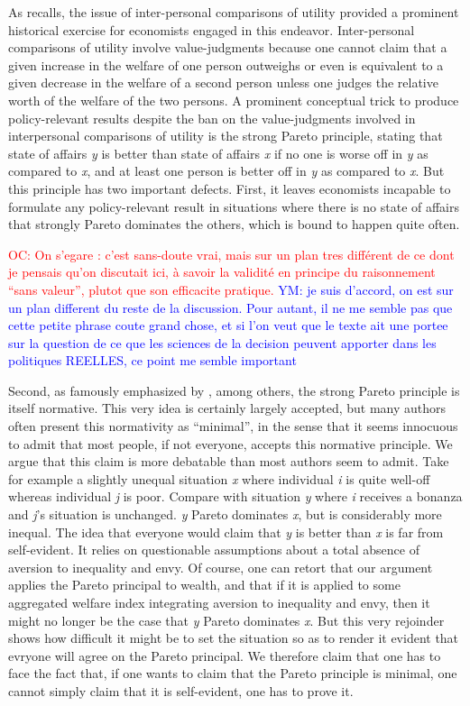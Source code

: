 \documentclass[preprint,11pt]{elsarticle}
\newcommand{\commentYM}[1]{\textcolor{blue}{YM: #1}}
\newcommand{\commentOC}[1]{\textcolor{red}{OC: #1}}
\begin{document}
As \cite{baujard_leconomie_2011} recalls, the issue of inter-personal comparisons of utility provided a prominent historical exercise for economists engaged in this endeavor. Inter-personal comparisons of utility involve value-judgments because one cannot claim that a given increase in the welfare of one person outweighs or even is equivalent to a given decrease in the welfare of a second person unless one judges the relative worth of the welfare of the two persons. A prominent conceptual trick to produce policy-relevant results despite the ban on the value-judgments involved in interpersonal comparisons of utility is the strong Pareto principle, stating that state of affairs \emph{y} is better than state of affairs \emph{x} if no one is worse off in \emph{y} as compared to \emph{x}, and at least one person is better off in \emph{y} as compared to \emph{x}. But this principle has two important defects. First, it leaves economists incapable to formulate any policy-relevant result in situations where there is no state of affairs that strongly Pareto dominates the others, which is bound to happen quite often. 

\commentOC{ On s'egare : c'est sans-doute vrai,
mais sur un plan tres différent de ce dont je pensais qu'on
discutait ici, à savoir la validité en principe du raisonnement
``sans valeur'', plutot que son efficacite pratique.}
\commentYM{je suis d'accord, on est sur un plan different du reste de la discussion. Pour autant, il ne me semble pas que cette petite phrase coute grand chose, et si l'on veut que le texte ait une portee sur la question de ce que les sciences de la decision peuvent apporter dans les politiques REELLES, ce point me semble important}

Second, as famously emphasized by \cite{sen_rationality_2004}, among others, the strong Pareto principle is itself normative. This very idea is certainly largely accepted, but many authors often present this normativity as ``minimal'', in the sense that it seems innocuous to admit that most people, if not everyone, accepts this normative principle. We argue that this claim is more debatable than most authors seem to admit. Take for example a slightly unequal situation \emph{x} where individual \emph{i} is quite well-off whereas individual \emph{j} is poor. Compare with situation \emph{y} where \emph{i} receives a bonanza and \emph{j}'s situation is unchanged. \emph{y} Pareto dominates \emph{x}, but is considerably more inequal. The idea that everyone would claim that \emph{y} is better than \emph{x} is far from self-evident. It relies on questionable assumptions about a total absence of aversion to inequality and envy. Of course, one can retort that our argument applies the Pareto principal to wealth, and that if it is applied to some aggregated welfare index integrating aversion to inequality and envy, then it might no longer be the case that \emph{y} Pareto dominates \emph{x}. But this very rejoinder shows how difficult it might be to set the situation so as to render it evident that evryone will agree on the Pareto principal. We therefore claim that one has to face the fact that, if one wants to claim that the Pareto principle is minimal, one cannot simply claim that it is self-evident, one has to prove it.
\end{document}
